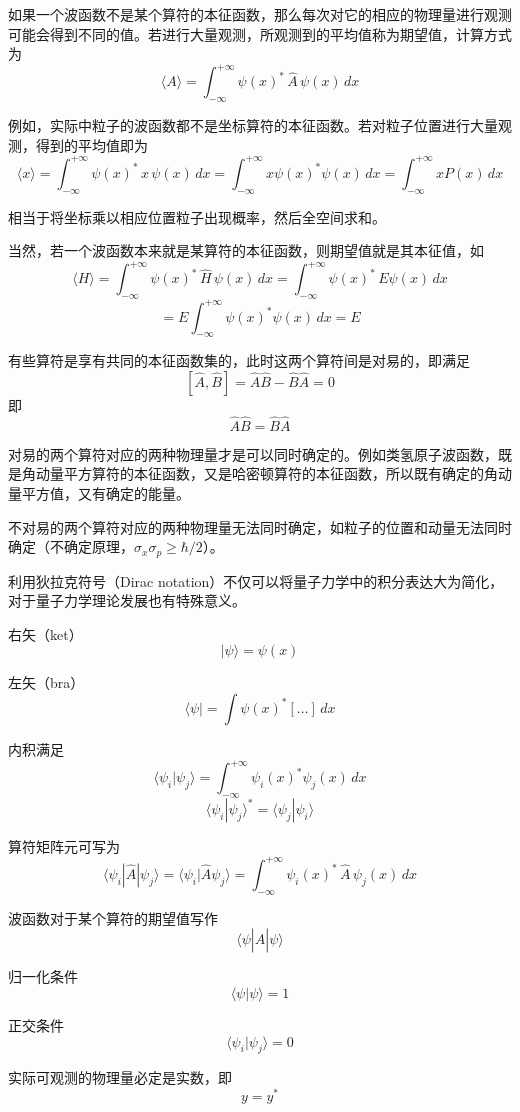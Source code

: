 如果一个波函数不是某个算符的本征函数，那么每次对它的相应的物理量进行观测可能会得到不同的值。若进行大量观测，所观测到的平均值称为期望值，计算方式为
\[
\langle A\rangle=\int_{-\infty}^{+\infty}\psi(x)^*\,\hat A\,\psi(x)\,dx
\]

例如，实际中粒子的波函数都不是坐标算符的本征函数。若对粒子位置进行大量观测，得到的平均值即为
\[
\langle x\rangle
=
\int_{-\infty}^{+\infty}\psi(x)^*\,x\,\psi(x)\,dx
=
\int_{-\infty}^{+\infty}x\psi(x)^*\psi(x)\,dx
=
\int_{-\infty}^{+\infty}xP(x)\,dx
\]

相当于将坐标乘以相应位置粒子出现概率，然后全空间求和。

当然，若一个波函数本来就是某算符的本征函数，则期望值就是其本征值，如
\[
\langle H\rangle
=
\int_{-\infty}^{+\infty}\psi(x)^*\,\hat H\,\psi(x)\,dx
=
\int_{-\infty}^{+\infty}\psi(x)^*\,E\psi(x)\,dx
\]
\[
=
E\int_{-\infty}^{+\infty}\psi(x)^*\psi(x)\,dx
=
E
\]

有些算符是享有共同的本征函数集的，此时这两个算符间是对易的，即满足
\[
[\hat A,\hat B]=\hat A\hat B-\hat B\hat A=0
\]
即
\[
\hat A\hat B=\hat B\hat A
\]

对易的两个算符对应的两种物理量才是可以同时确定的。例如类氢原子波函数，既是角动量平方算符的本征函数，又是哈密顿算符的本征函数，所以既有确定的角动量平方值，又有确定的能量。

不对易的两个算符对应的两种物理量无法同时确定，如粒子的位置和动量无法同时确定（不确定原理，$\sigma_x\sigma_p\ge \hbar/2$）。

利用狄拉克符号（Dirac notation）不仅可以将量子力学中的积分表达大为简化，对于量子力学理论发展也有特殊意义。

右矢（ket）
\[
|\psi\rangle=\psi(x)
\]

左矢（bra）
\[
\langle \psi|=\int \psi(x)^*[\ldots]\,dx
\]

内积满足
\[
\langle \psi_i|\psi_j\rangle=\int_{-\infty}^{+\infty}\psi_i(x)^*\psi_j(x)\,dx
\]
\[
\langle \psi_i|\psi_j\rangle^*=\langle \psi_j|\psi_i\rangle
\]

算符矩阵元可写为
\[
\langle \psi_i|\hat A|\psi_j\rangle
=
\langle \psi_i|\hat A\psi_j\rangle
=
\int_{-\infty}^{+\infty}\psi_i(x)^*\,\hat A\,\psi_j(x)\,dx
\]

波函数对于某个算符的期望值写作
\[
\langle \psi|\hat A|\psi\rangle
\]

归一化条件
\[
\langle \psi|\psi\rangle=1
\]

正交条件
\[
\langle \psi_i|\psi_j\rangle=0
\]

实际可观测的物理量必定是实数，即
\[
y=y^*
\]

